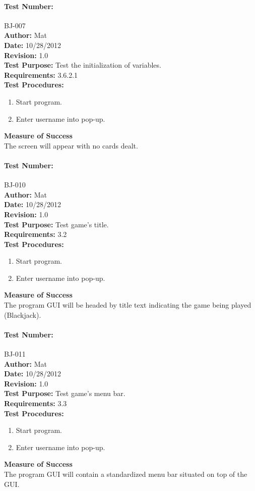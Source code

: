 \documentclass{article}
\begin{document}
\paragraph{Test Number:} BJ-007\\
\textbf{Author:} Mat\\
\textbf{Date:} 10/28/2012\\
\textbf{Revision:} 1.0\\
\textbf{Test Purpose:} Test the initialization of variables.\\
\textbf{Requirements:} 3.6.2.1 \\
\textbf{Test Procedures:} 
\begin{enumerate}
\item Start program.
\item Enter username into pop-up.
\end{enumerate}
\textbf{Measure of Success}\\The screen will appear with no cards dealt.
\paragraph{Test Number:} BJ-010\\
\textbf{Author:} Mat\\
\textbf{Date:} 10/28/2012\\
\textbf{Revision:} 1.0\\
\textbf{Test Purpose:} Test game's title.\\
\textbf{Requirements:} 3.2 \\
\textbf{Test Procedures:} 
\begin{enumerate}
\item Start program.
\item Enter username into pop-up.
\end{enumerate}
\textbf{Measure of Success}\\The program GUI will be headed by title text indicating the game being played (Blackjack).
\paragraph{Test Number:} BJ-011\\
\textbf{Author:} Mat\\
\textbf{Date:} 10/28/2012\\
\textbf{Revision:} 1.0\\
\textbf{Test Purpose:} Test game's menu bar.\\
\textbf{Requirements:} 3.3 \\
\textbf{Test Procedures:} 
\begin{enumerate}
\item Start program.
\item Enter username into pop-up.
\end{enumerate}
\textbf{Measure of Success}\\The program GUI will contain a standardized menu bar situated on top of the GUI.
\end{document}
